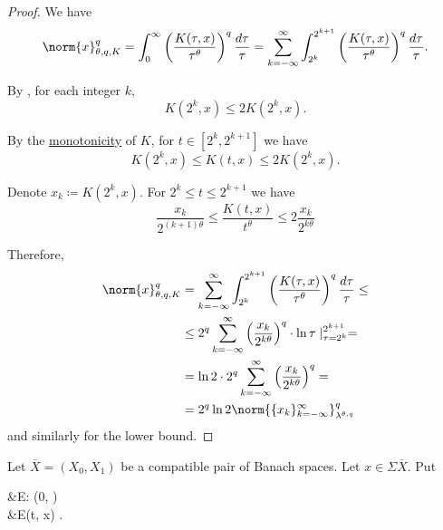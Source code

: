 \begin{proof}
  We have
  \begin{equation*}
    \norm{x}_{\theta,q,K}^q
    =
    \int_0^\infty \left( \frac {K(\tau, x)} {\tau^\theta} \right)^q \frac {d\tau} \tau
    =
    \sum_{k=-\infty}^\infty \int_{2^k}^{2^{k+1}} \left( \frac {K(\tau, x)} {\tau^\theta} \right)^q \frac {d\tau} \tau.
  \end{equation*}

  By , for each integer \( k \),
  \begin{equation*}
    K(2^k, x) \leq 2 K(2^k, x).
  \end{equation*}

  By the \hyperref[def:k_functional_properties/basic]{monotonicity} of \( K \), for \( t \in [2^k, 2^{k+1}] \) we have
  \begin{equation*}
    K(2^k, x) \leq K(t, x) \leq 2 K(2^k, x).
  \end{equation*}

  Denote \( x_k \coloneqq K(2^k, x) \). For \( 2^k \leq t \leq 2^{k+1} \) we have
  \begin{equation*}
    \frac{x_k}{2^{(k+1)\theta}} \leq \frac{K(t, x)}{t^\theta} \leq 2 \frac{x_k}{2^{k\theta}}
  \end{equation*}

  Therefore,
  \begin{align*}
    \norm{x}_{\theta,q,K}^q
    &=
    \sum_{k=-\infty}^\infty \int_{2^k}^{2^{k+1}} \left( \frac {K(\tau, x)} {\tau^\theta} \right)^q \frac {d\tau} \tau
    \leq \\ &\leq
    2^q \sum_{k=-\infty}^\infty \left(\frac{x_k}{2^{k\theta}} \right)^q \cdot \ln \tau \mid_{\tau=2^k}^{2^{k+1}}
    = \\ &=
    \ln 2 \cdot 2^q \sum_{k=-\infty}^\infty \left(\frac{x_k}{2^{k\theta}} \right)^q
    = \\ &=
    2^q \ln 2 \norm{\{ x_k \}_{k=-\infty}^\infty}_{\lambda^{\theta,q}}^q
  \end{align*}
  and similarly for the lower bound.
\end{proof}

\begin{definition}\label{def:e_functional}
  Let \( \overline{X} = (X_0, X_1) \) be a compatible pair of Banach spaces. Let \( x \in \Sigma \overline{X} \). Put
  \begin{alignedeq}\label{eq:def:e_functional}
    &E: (0, \infty)  \\
    &E(t, x) \coloneqq \inf {}.
  \end{alignedeq}
\end{definition}


